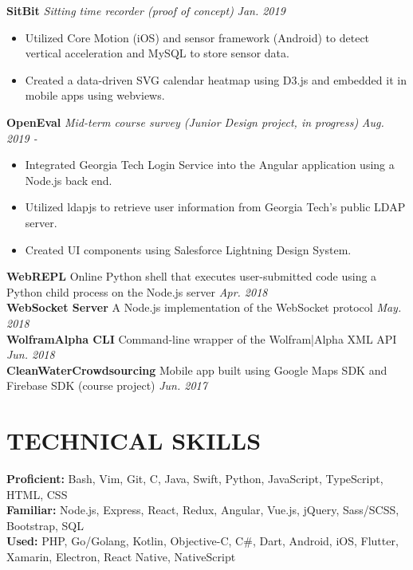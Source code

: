\documentclass[11pt]{article}
\begin{document}
\vspace{0.5em}
%
\textbf{SitBit} \enspace \textit{\color{gray} Sitting time recorder (proof of concept)}  \hfill \textit{Jan. 2019}
\begin{itemize}[leftmargin=15pt, noitemsep, topsep=0pt]
\item Utilized Core Motion (iOS) and sensor framework (Android) to detect vertical acceleration and MySQL to store sensor data.
\item Created a data-driven SVG calendar heatmap using D3.js and embedded it in mobile apps using webviews.
\end{itemize}
\vspace{0.5em}
%
\textbf{OpenEval} \enspace \textit{\color{gray} Mid-term course survey (Junior Design project, in progress)} \hfill \textit{Aug. 2019 -}
\begin{itemize}[leftmargin=15pt, noitemsep, topsep=0pt]
\item Integrated Georgia Tech Login Service  into the Angular application using a Node.js back end.
\item Utilized ldapjs to retrieve user information from Georgia Tech's public LDAP server.
\item Created UI components using Salesforce Lightning Design System.
\end{itemize}
\vspace{0.5em}
%
\textbf{WebREPL}  \enspace Online Python shell that executes user-submitted code using a Python child process on the Node.js server \hfill\textit{Apr. 2018}\\
\textbf{WebSocket Server}  \enspace A Node.js implementation of the WebSocket protocol \hfill\textit{May. 2018}\\
\textbf{WolframAlpha CLI} \enspace Command-line wrapper of the Wolfram|Alpha XML API \hfill\textit{Jun. 2018}\\
\textbf{CleanWaterCrowdsourcing} \enspace Mobile app built using Google Maps SDK and Firebase SDK (course project) \hfill\textit{Jun. 2017}

\section*{TECHNICAL SKILLS}
\textbf{Proficient:} Bash, Vim, Git, C, Java, Swift, Python, JavaScript, TypeScript, HTML, CSS\\
\textbf{Familiar:} Node.js, Express, React, Redux, Angular, Vue.js, jQuery, Sass/SCSS, Bootstrap, SQL\\
\textbf{Used:} PHP, Go/Golang, Kotlin, Objective-C, C\#, Dart, Android, iOS, Flutter, Xamarin, Electron, React Native, NativeScript
\end{document}
